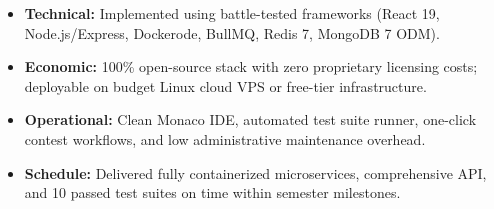 \documentclass[10pt]{article}
\begin{document}
\begin{minipage}[t]{0.492\textwidth}
  \begin{tcolorbox}[
    equal height group=row4,
    colback=feasbg, colframe=feasframe,
    title={\textbf{\color{feastitle}Feasibility Study}},
    fonttitle=\fontsize{8.5}{10}\selectfont,
    coltitle=feastitle, colbacktitle=feasbg,
    boxrule=0.7pt, arc=1.5mm,
    top=3pt, bottom=3pt, left=4pt, right=4pt, toptitle=1pt, bottomtitle=1pt
  ]
  \fontsize{7.2}{8.6}\selectfont
  \begin{itemize}
    \item \textbf{Technical:} Implemented using battle-tested frameworks (React 19, Node.js/Express, Dockerode, BullMQ, Redis 7, MongoDB 7 ODM).
    \item \textbf{Economic:} 100\% open-source stack with zero proprietary licensing costs; deployable on budget Linux cloud VPS or free-tier infrastructure.
    \item \textbf{Operational:} Clean Monaco IDE, automated test suite runner, one-click contest workflows, and low administrative maintenance overhead.
    \item \textbf{Schedule:} Delivered fully containerized microservices, comprehensive API, and 10 passed test suites on time within semester milestones.
  \end{itemize}
  \end{tcolorbox}

\end{minipage}\hfill
\end{document}
